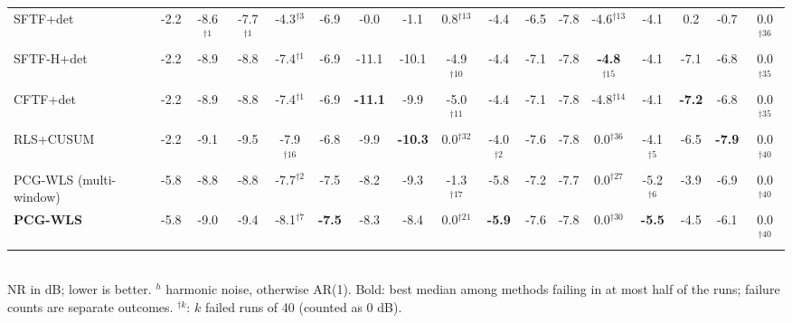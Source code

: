 \begin{table}[t]
{\begin{tabular}{lcccccccccccccccc}
SFTF+det & -2.2 & -8.6$^{\dagger1}$ & -7.7$^{\dagger1}$ & -4.3$^{\dagger3}$ & -6.9 & -0.0 & -1.1 & 0.8$^{\dagger13}$ & -4.4 & -6.5 & -7.8 & -4.6$^{\dagger13}$ & -4.1 & 0.2 & -0.7 & 0.0$^{\dagger36}$ \\
SFTF-H+det & -2.2 & -8.9 & -8.8 & -7.4$^{\dagger1}$ & -6.9 & -11.1 & -10.1 & -4.9$^{\dagger10}$ & -4.4 & -7.1 & -7.8 & \textbf{-4.8$^{\dagger15}$} & -4.1 & -7.1 & -6.8 & 0.0$^{\dagger35}$ \\
CFTF+det & -2.2 & -8.9 & -8.8 & -7.4$^{\dagger1}$ & -6.9 & \textbf{-11.1} & -9.9 & -5.0$^{\dagger11}$ & -4.4 & -7.1 & -7.8 & -4.8$^{\dagger14}$ & -4.1 & \textbf{-7.2} & -6.8 & 0.0$^{\dagger35}$ \\
RLS+CUSUM & -2.2 & -9.1 & -9.5 & -7.9$^{\dagger16}$ & -6.8 & -9.9 & \textbf{-10.3} & 0.0$^{\dagger32}$ & -4.0$^{\dagger2}$ & -7.6 & -7.8 & 0.0$^{\dagger36}$ & -4.1$^{\dagger5}$ & -6.5 & \textbf{-7.9} & 0.0$^{\dagger40}$ \\
PCG-WLS (multi-window) & -5.8 & -8.8 & -8.8 & -7.7$^{\dagger2}$ & -7.5 & -8.2 & -9.3 & -1.3$^{\dagger17}$ & -5.8 & -7.2 & -7.7 & 0.0$^{\dagger27}$ & -5.2$^{\dagger6}$ & -3.9 & -6.9 & 0.0$^{\dagger40}$ \\
\textbf{PCG-WLS} & -5.8 & -9.0 & -9.4 & -8.1$^{\dagger7}$ & \textbf{-7.5} & -8.3 & -8.4 & 0.0$^{\dagger21}$ & \textbf{-5.9} & -7.6 & -7.8 & 0.0$^{\dagger30}$ & \textbf{-5.5} & -4.5 & -6.1 & 0.0$^{\dagger40}$ \\
\bottomrule
\end{tabular}}
\\[2pt]{\scriptsize NR in dB; lower is better. $^h$ harmonic noise, otherwise AR(1). Bold: best median among methods failing in at most half of the runs; failure counts are separate outcomes. $^{\dagger k}$: $k$ failed runs of 40 (counted as 0 dB).}
\end{table}
